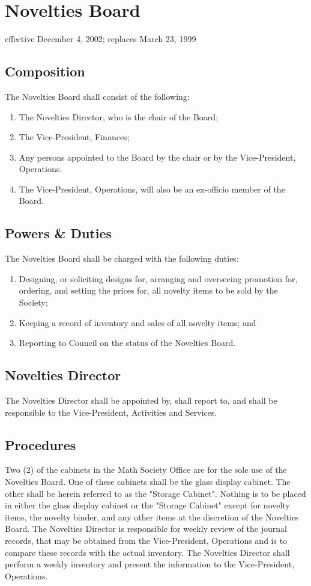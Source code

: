 \section{Novelties Board}
effective December 4, 2002; replaces March 23, 1999

\subsection{Composition}
The Novelties Board shall consist of the following:
\begin{enumerate}
\item The Novelties Director, who is the chair of the Board;
\item The Vice-President, Finances;
\item Any persons appointed to the Board by the chair or by the Vice-President, Operations.
\item The Vice-President, Operations, will also be an ex-officio member of the Board.
\end{enumerate}

\subsection{Powers \& Duties}
The Novelties Board shall be charged with the following duties:
\begin{enumerate}
\item Designing, or soliciting designs for, arranging and overseeing promotion for, ordering, and setting the prices for, all novelty items to be sold by the Society;
\item Keeping a record of inventory and sales of all novelty items; and
\item Reporting to Council on the status of the Novelties Board.
\end{enumerate}

\subsection{Novelties Director}
The Novelties Director shall be appointed by, shall report to, and shall be responsible to the Vice-President, Activities and Services.

\subsection{Procedures}
Two (2) of the cabinets in the Math Society Office are for the sole use of the Novelties Board. One of these cabinets shall be the glass display cabinet. The other shall be herein referred to as the "Storage Cabinet".
Nothing is to be placed in either the glass display cabinet or the "Storage Cabinet" except for novelty items, the novelty binder, and any other items at the discretion of the Novelties Board.
The Novelties Director is responsible for weekly review of the journal records, that may be obtained from the Vice-President, Operations and is to compare these records with the actual inventory.
The Novelties Director shall perform a weekly inventory and present the information to the Vice-President, Operations.